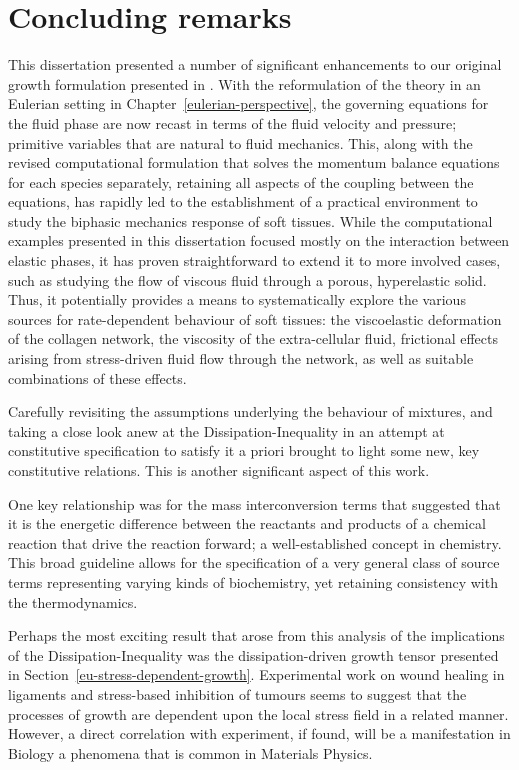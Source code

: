 \chapter{Concluding remarks}
\label{conclusions}

This dissertation presented a number of significant enhancements to
our original growth formulation presented in \citet{growthpaper}.
With the reformulation of the theory in an Eulerian setting in
Chapter~\ref{eulerian-perspective}, the governing equations for the
fluid phase are now recast in terms of the fluid velocity and
pressure; primitive variables that are natural to fluid
mechanics. This, along with the revised computational formulation that
solves the momentum balance equations for each species separately,
retaining all aspects of the coupling between the equations, has
rapidly led to the establishment of a practical environment to study
the biphasic mechanics response of soft tissues. While the
computational examples presented in this dissertation focused mostly
on the interaction between elastic phases, it has proven
straightforward to extend it to more involved cases, such as studying
the flow of viscous fluid through a porous, hyperelastic solid. Thus,
it potentially provides a means to systematically explore the various
sources for rate-dependent behaviour of soft tissues:  the
viscoelastic deformation of the collagen network, the viscosity of the
extra-cellular fluid, frictional effects arising from stress-driven
fluid flow through the network, as well as suitable combinations of
these effects.

Carefully revisiting the assumptions underlying the behaviour of
mixtures, and taking a close look anew at the Dissipation-Inequality
in an attempt at constitutive specification to satisfy it a priori
brought to light some new, key constitutive relations. This is another
significant aspect of this work.

One key relationship was for the mass interconversion terms that
suggested that it is the energetic difference between the reactants
and products of a chemical reaction that drive the reaction forward; a
well-established concept in chemistry. This broad guideline allows for
the specification of a very general class of source terms representing
varying kinds of biochemistry, yet retaining consistency with the
thermodynamics.

Perhaps the most exciting result that arose from this analysis of the
implications of the Dissipation-Inequality was the dissipation-driven
growth tensor presented in
Section~\ref{eu-stress-dependent-growth}. Experimental work on wound
healing in ligaments \citep{Provenzanoetal:2003} and stress-based
inhibition of tumours \citep{jain1997} seems to suggest that the
processes of growth are dependent upon the local stress field in a
related manner. However, a direct correlation with experiment, if
found, will be a manifestation in Biology a phenomena that is common
in Materials Physics.

%

